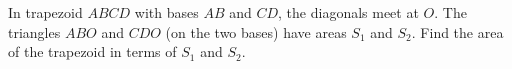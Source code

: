 In trapezoid $ABCD$ with bases $AB$ and $CD$, the diagonals meet at $O$. The triangles $ABO$ and $CDO$ (on the two bases) have areas $S_1$ and $S_2$. Find the area of the trapezoid in terms of $S_1$ and $S_2$.
